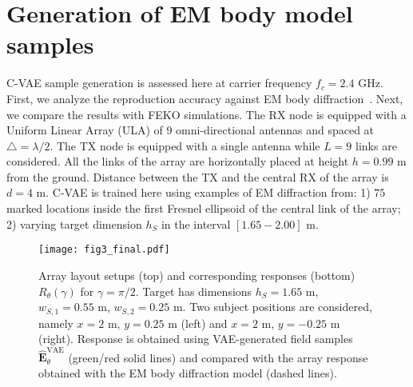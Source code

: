 \section{Generation of EM body model samples \label{sec:Model-validation}}

C-VAE sample generation is assessed here at carrier frequency $f_{c}=2.4$ GHz. First, we analyze the reproduction accuracy against EM body diffraction~\cite{rampa-2022a}. Next, we compare the results with FEKO\textsuperscript{\textregistered} simulations. The RX node is equipped with a Uniform Linear Array (ULA) of $9$ omni-directional antennas and spaced at $\triangle=\lambda/2$. The TX node is equipped with a single antenna while $L=9$ links are considered. All the links of the array are horizontally placed at height $h=0.99$ m from the ground. Distance between the TX and the central RX of the array is $d=4$ m. C-VAE is trained here using examples of EM diffraction from: 1) $75$ marked locations inside the first Fresnel ellipsoid of the central link of the array; 2) varying target dimension $h_{S}$ in the interval $[1.65 - 2.00]$ m.

\begin{figure}
\centering \texttt{[image: fig3\_final.pdf]} \protect\caption{\label{response} Array layout setups (top) and corresponding responses (bottom) $R_{\theta}(\gamma)$ for $\gamma=\pi/2$. Target has dimensions $h_{S}=1.65$ m, $w_{S,1}=0.55$ m, $w_{S,2}=0.25$ m. Two subject positions are considered, namely $x=2$ m, $y=0.25$ m (left) and $x=2$ m, $y=-0.25$ m (right). Response is obtained using VAE-generated field samples $\widehat{\mathbf{E}}_{\theta}^{\mathrm{VAE}}$ (green/red solid lines) and compared with the array response obtained with the EM body diffraction model (dashed lines).}
\end{figure}

